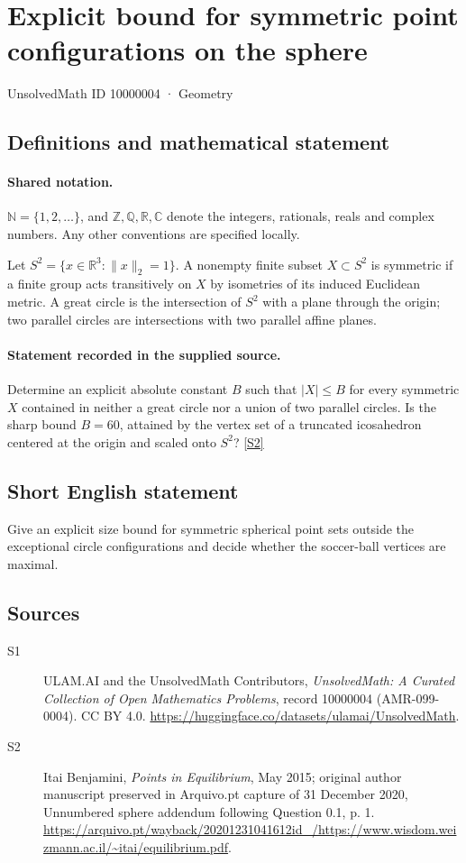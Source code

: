 \documentclass[11pt]{article}
\newcommand{\sref}[2]{\hyperlink{source:#1:#2}{[S#2]}}
\begin{document}
\setcounter{section}{10000003}
\section{Explicit bound for symmetric point configurations on the sphere}\label{10000004}
{\small\sffamily UnsolvedMath ID 10000004 · Geometry}
\subsection{Definitions and mathematical statement}

\paragraph{Shared notation.}$\mathbb N=\{1,2,\ldots\}$, and $\mathbb Z,\mathbb Q,\mathbb R,\mathbb C$ denote the integers, rationals, reals and complex numbers. Any other conventions are specified locally.


Let $S^2=\{x\in\mathbb R^3:\|x\|_2=1\}$. A nonempty finite subset $X\subset S^2$ is symmetric if a finite group acts transitively on $X$ by isometries of its induced Euclidean metric. A great circle is the intersection of $S^2$ with a plane through the origin; two parallel circles are intersections with two parallel affine planes.
\paragraph{Statement recorded in the supplied source.}
Determine an explicit absolute constant $B$ such that $|X|\le B$ for every symmetric $X$ contained in neither a great circle nor a union of two parallel circles. Is the sharp bound $B=60$, attained by the vertex set of a truncated icosahedron centered at the origin and scaled onto $S^2$? \sref{10000004}{2}
\subsection{Short English statement}
Give an explicit size bound for symmetric spherical point sets outside the exceptional circle configurations and decide whether the soccer-ball vertices are maximal.
\subsection{Sources}
\begin{description}
\item[\hypertarget{source:10000004:1}{S1}] ULAM.AI and the UnsolvedMath Contributors, \emph{UnsolvedMath: A Curated Collection of Open Mathematics Problems}, record 10000004 (AMR-099-0004). CC BY 4.0. \url{https://huggingface.co/datasets/ulamai/UnsolvedMath}.
\item[\hypertarget{source:10000004:2}{S2}] Itai Benjamini, \emph{Points in Equilibrium}, May 2015; original author manuscript preserved in Arquivo.pt capture of 31 December 2020, Unnumbered sphere addendum following Question 0.1, p. 1. \url{https://arquivo.pt/wayback/20201231041612id_/https://www.wisdom.weizmann.ac.il/~itai/equilibrium.pdf}.
\end{description}
\label{end:10000004}
\end{document}
